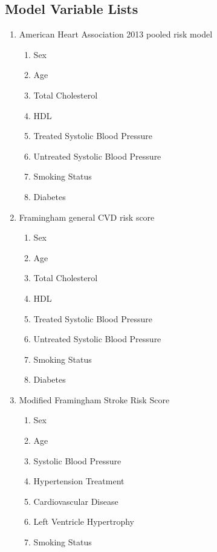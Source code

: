 \documentclass[a4paper,12pt]{article}
\begin{document}
   	\printbibliography[heading=none]
   	
   	\newpage
   	\begin{appendices}
   		
   		\section{Model Variable Lists}
   		\begin{enumerate}
   			\item American Heart Association 2013 pooled risk model
   			\begin{enumerate}
   				\item Sex
   				\item Age
   				\item Total Cholesterol
   				\item HDL
   				\item Treated Systolic Blood Pressure
   				\item Untreated Systolic Blood Pressure
   				\item Smoking Status
   				\item Diabetes
   			\end{enumerate}
   			\item Framingham general CVD risk score
   			\begin{enumerate}
   				\item Sex
   				\item Age
   				\item Total Cholesterol
   				\item HDL
   				\item Treated Systolic Blood Pressure
   				\item Untreated Systolic Blood Pressure
   				\item Smoking Status
   				\item Diabetes
   			\end{enumerate}
   			\item Modified Framingham Stroke Risk Score
   			\begin{enumerate}
   				\item Sex
   				\item Age
   				\item Systolic Blood Pressure
   				\item Hypertension Treatment
   				\item Cardiovascular Disease
   				\item Left Ventricle Hypertrophy
   				\item Smoking Status

\end{enumerate}
\end{enumerate}
\end{appendices}
\end{document}
